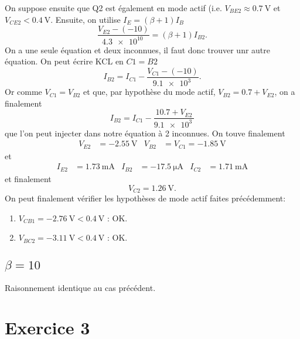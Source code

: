 \documentclass[frenchb,DIV=13]{scrartcl}
\begin{document}
On suppose ensuite que Q2 est également en mode actif (i.e. $V_{BE2} \approx \SI{0.7}{\volt}$
et $V_{CE2} < \SI{0.4}{\volt}$. Ensuite, on utilise $I_E = (\beta+1)I_B$
\[ \frac{V_{E2}-(-10)}{\SI{4.3e10}{}} = (\beta+1)I_{B2}. \]
On a une seule équation et deux inconnues, il faut donc trouver unr autre équation. On
peut écrire KCL en $C1 = B2$
\[ I_{B2} = I_{C1} - \frac{V_{C1}-(-10)}{\SI{9.1e3}{}}. \]
Or comme $V_{C1} = V_{B2}$ et que, par hypothèse du mode actif, $V_{B2} = 0.7 + V_{E2}$,
on a finalement
\[ I_{B2} = I_{C1} - \frac{10.7 + V_{E2}}{\SI{9.1e3}{}}\]
que l'on peut injecter dans notre équation à 2 inconnues.
On touve finalement
\begin{align*}
	V_{E2} &= -\SI{2.55}{\volt} & V_{B2} &= V_{C1} = -\SI{1.85}{\volt}
\end{align*}
et
\begin{align*}
	I_{E2} &= \SI{1.73}{\milli\ampere} & I_{B2} &= -\SI{17.5}{\micro\ampere} & I_{C2} &=
	\SI{1.71}{\milli\ampere}
\end{align*}
et finalement
\[ V_{C2} = \SI{1.26}{\volt}. \]
On peut finalement vérifier les hypothèses de mode actif faites précédemment:
\begin{enumerate}
	\item $V_{CB1} = -\SI{2.76}{\volt} < \SI{0.4}{\volt}$ : OK.
	\item $V_{BC2} = -\SI{3.11}{\volt} < \SI{0.4}{\volt}$ : OK.
\end{enumerate}
 
\subsection*{$\beta = 10$}
Raisonnement identique au cas précédent.

\section*{Exercice 3}
\end{document}

